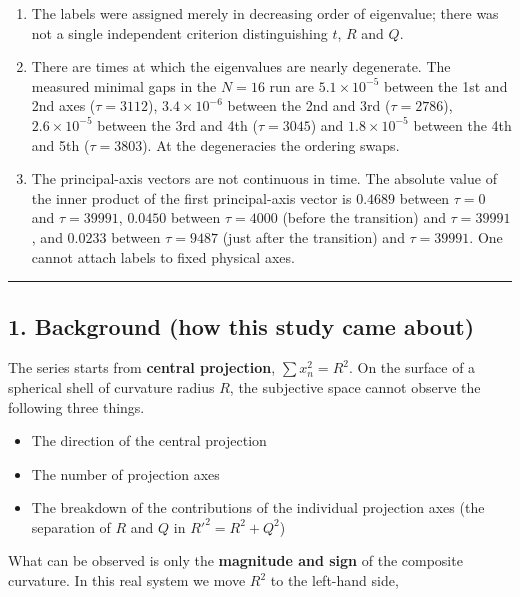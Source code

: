 \documentclass[
  10pt,
]{article}
\providecommand{\tightlist}{%
  \setlength{\itemsep}{0pt}\setlength{\parskip}{0pt}}
\begin{document}
\begin{enumerate}
\def\labelenumi{\arabic{enumi}.}
\tightlist
\item
  The labels were assigned merely in decreasing order of eigenvalue;
  there was not a single independent criterion distinguishing \(t\),
  \(R\) and \(Q\).
\item
  There are times at which the eigenvalues are nearly degenerate. The
  measured minimal gaps in the \(N=16\) run are \(5.1\times10^{-5}\)
  between the 1st and 2nd axes (\(\tau = 3112\)), \(3.4\times10^{-6}\)
  between the 2nd and 3rd (\(\tau = 2786\)), \(2.6\times10^{-5}\)
  between the 3rd and 4th (\(\tau = 3045\)) and \(1.8\times10^{-5}\)
  between the 4th and 5th (\(\tau = 3803\)). At the degeneracies the
  ordering swaps.
\item
  The principal-axis vectors are not continuous in time. The absolute
  value of the inner product of the first principal-axis vector is
  \(0.4689\) between \(\tau = 0\) and \(\tau = 39991\), \(0.0450\)
  between \(\tau = 4000\) (before the transition) and \(\tau = 39991\),
  and \(0.0233\) between \(\tau = 9487\) (just after the transition) and
  \(\tau = 39991\). One cannot attach labels to fixed physical axes.
\end{enumerate}

\begin{center}\rule{0.5\linewidth}{0.5pt}\end{center}

\subsection{1. Background (how this study came
about)}\label{background-how-this-study-came-about}

The series starts from \textbf{central projection},
\(\sum x_n^2 = R^2\). On the surface of a spherical shell of curvature
radius \(R\), the subjective space cannot observe the following three
things.

\begin{itemize}
\tightlist
\item
  The direction of the central projection
\item
  The number of projection axes
\item
  The breakdown of the contributions of the individual projection axes
  (the separation of \(R\) and \(Q\) in \(R'^2 = R^2 + Q^2\))
\end{itemize}

What can be observed is only the \textbf{magnitude and sign} of the
composite curvature. In this real system we move \(R^2\) to the
left-hand side,
\end{document}
